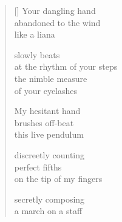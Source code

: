 \documentclass[11pt,a4paper]{article}
\begin{document}
\thispagestyle{empty}


\settowidth{\versewidth}{at the rhythm of your steps}

\bigskip

\begin{verse}[\versewidth]
  Your dangling hand \\
  abandoned to the wind \\
  like a liana

  slowly beats \\
  at the rhythm of your steps \\
  the nimble measure \\
  of your eyelashes

  My hesitant hand \\
  brushes off-beat \\
  this live pendulum

  discreetly counting \\
  perfect fifths \\
  on the tip of my fingers

  secretly composing \\
  a march on a staff
  \end{verse}
\end{document}
